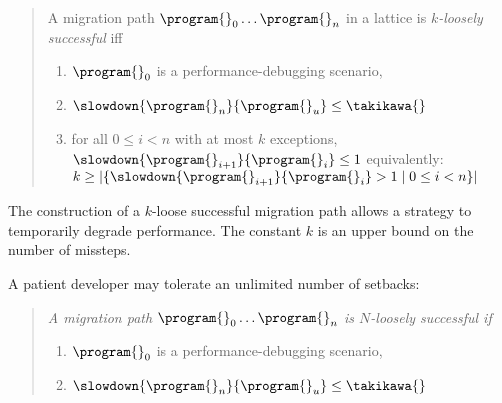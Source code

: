 \begin{quote} \em

A migration path ${\program{}_0} \ldots {\program{}_n}$ in a
lattice  is \emph{$k$-loosely successful}
iff 
\begin{enumerate}
  \item  $\program{}_0$ is a performance-debugging scenario,
  \item $\slowdown{\program{}_n}{\program{}_u} \leq \takikawa{}$  
  \item
      for all $0 \leq i < n$ with at most $k$ exceptions,
      $\slowdown{\program{}_{i+1}}{\program{}_{i}} \leq 1$
      \subitem equivalently: $k \geq |\{ \slowdown{\program{}_{i+1}}{\program{}_{i}} > 1 \mid 0 \leq i < n\}|$
  \end{enumerate} 
\end{quote}
The construction of a $k$-loose successful migration path allows a strategy to
temporarily degrade performance. The constant $k$ is an
upper bound on the number of missteps.

A patient developer may tolerate an unlimited number of setbacks:

\begin{quote} \em
A migration path ${\program{}_0} \ldots {\program{}_n}$ is $N$-loosely successful if 
  \begin{enumerate}
  \item  $\program{}_0$ is a performance-debugging scenario,
  \item $\slowdown{\program{}_n}{\program{}_u} \leq \takikawa{}$  
  \end{enumerate}
\end{quote}



